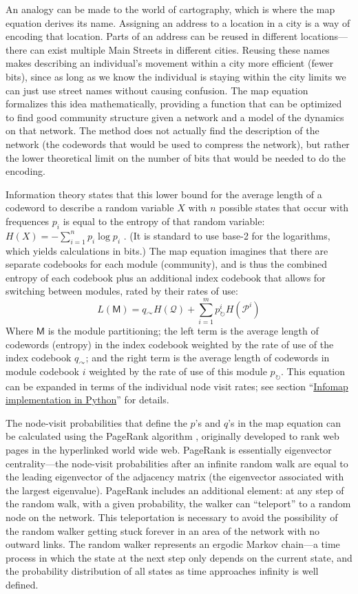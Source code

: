 An analogy can be made to the world of cartography, which is where the
map equation derives its name. Assigning an address to a location in a
city is a way of encoding that location. Parts of an address can be
reused in different locations---there can exist multiple Main Streets in
different cities. Reusing these names makes describing an individual's
movement within a city more efficient (fewer bits), since as long as we
know the individual is staying within the city limits we can just use
street names without causing confusion. The map equation formalizes this
idea mathematically, providing a function that can be optimized to find
good community structure given a network and a model of the dynamics on
that network. The method does not actually find the description of the
network (the codewords that would be used to compress the network), but
rather the lower theoretical limit on the number of bits that would be
needed to do the encoding.

Information theory states that this lower bound for the average length
of a codeword to describe a random variable \(X\) with \(n\) possible
states that occur with frequences \(p_i\) is equal to the entropy of
that random variable: \(H(X) = -\sum_{i=1}^{n}{p_i\log{p_i}}\)
\autocite{cover_elements_2012}. (It is standard to use base-2 for the
logarithms, which yields calculations in bits.) The map equation
imagines that there are separate codebooks for each module (community),
and is thus the combined entropy of each codebook plus an additional
index codebook that allows for switching between modules, rated by their
rates of use:
\[L(\mathsf{M}) = q_{\curvearrowright} H(\mathcal{Q}) + \sum_{i=1}^{m}{p_{\circlearrowright}^{i} H(\mathcal{P}^i)}\]
Where \(\mathsf{M}\) is the module partitioning; the left term is the
average length of codewords (entropy) in the index codebook weighted by
the rate of use of the index codebook \(q_{\curvearrowright}\); and the
right term is the average length of codewords in module codebook \(i\)
weighted by the rate of use of this module \(p_{\circlearrowright}\).
This equation can be expanded in terms of the individual node visit
rates; see section ``\protect\hyperlink{pyinfomap}{Infomap
implementation in Python}'' for details.

The node-visit probabilities that define the \(p\)'s and \(q\)'s in the
map equation can be calculated using the PageRank algorithm
\autocite{page_pagerank_1999}, originally developed to rank web pages in
the hyperlinked world wide web. PageRank is essentially eigenvector
centrality---the node-visit probabilities after an infinite random walk
are equal to the leading eigenvector of the adjacency matrix (the
eigenvector associated with the largest eigenvalue). PageRank includes
an additional element: at any step of the random walk, with a given
probability, the walker can ``teleport'' to a random node on the
network. This teleportation is necessary to avoid the possibility of the
random walker getting stuck forever in an area of the network with no
outward links. The random walker represents an ergodic Markov chain---a
time process in which the state at the next step only depends on the
current state, and the probability distribution of all states as time
approaches infinity is well defined.

